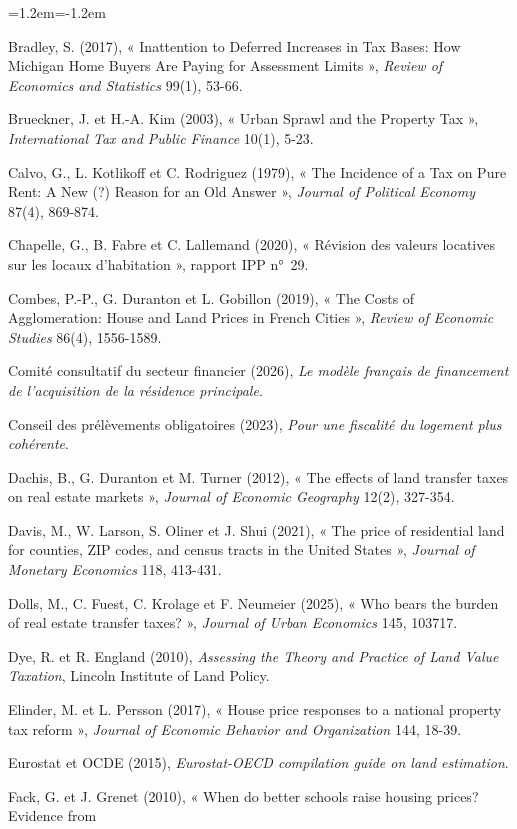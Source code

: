 \documentclass[11pt,a4paper]{article}
\begin{document}
\begin{list}{}{\leftmargin=1.2em\itemindent=-1.2em\itemsep=1pt\parsep=0pt}
\item Bradley, S. (2017), « Inattention to Deferred Increases in Tax Bases: How Michigan Home Buyers
Are Paying for Assessment Limits », \emph{Review of Economics and Statistics} 99(1), 53-66.
\item Brueckner, J. et H.-A. Kim (2003), « Urban Sprawl and the Property Tax », \emph{International
Tax and Public Finance} 10(1), 5-23.
\item Calvo, G., L. Kotlikoff et C. Rodriguez (1979), « The Incidence of a Tax on Pure Rent: A New
(?) Reason for an Old Answer », \emph{Journal of Political Economy} 87(4), 869-874.
\item Chapelle, G., B. Fabre et C. Lallemand (2020), « Révision des valeurs locatives sur les locaux
d'habitation », rapport IPP n°~29.
\item Combes, P.-P., G. Duranton et L. Gobillon (2019), « The Costs of Agglomeration: House and Land
Prices in French Cities », \emph{Review of Economic Studies} 86(4), 1556-1589.
\item Comité consultatif du secteur financier (2026), \emph{Le modèle français de financement de
l'acquisition de la résidence principale}.
\item Conseil des prélèvements obligatoires (2023), \emph{Pour une fiscalité du logement plus
cohérente}.
\item Dachis, B., G. Duranton et M. Turner (2012), « The effects of land transfer taxes on real
estate markets », \emph{Journal of Economic Geography} 12(2), 327-354.
\item Davis, M., W. Larson, S. Oliner et J. Shui (2021), « The price of residential land for
counties, ZIP codes, and census tracts in the United States », \emph{Journal of Monetary
Economics} 118, 413-431.
\item Dolls, M., C. Fuest, C. Krolage et F. Neumeier (2025), « Who bears the burden of real estate
transfer taxes? », \emph{Journal of Urban Economics} 145, 103717.
\item Dye, R. et R. England (2010), \emph{Assessing the Theory and Practice of Land Value Taxation},
Lincoln Institute of Land Policy.
\item Elinder, M. et L. Persson (2017), « House price responses to a national property tax
reform », \emph{Journal of Economic Behavior and Organization} 144, 18-39.
\item Eurostat et OCDE (2015), \emph{Eurostat-OECD compilation guide on land estimation}.
\item Fack, G. et J. Grenet (2010), « When do better schools raise housing prices? Evidence from

\end{list}
\end{document}
